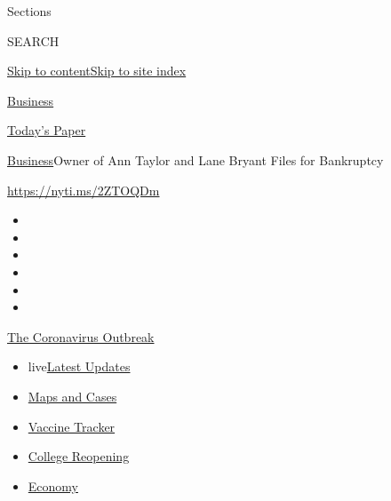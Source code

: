 Sections

SEARCH

\protect\hyperlink{site-content}{Skip to
content}\protect\hyperlink{site-index}{Skip to site index}

\href{https://www.nytimes3xbfgragh.onion/section/business}{Business}

\href{https://myaccount.nytimes3xbfgragh.onion/auth/login?response_type=cookie\&client_id=vi}{}

\href{https://www.nytimes3xbfgragh.onion/section/todayspaper}{Today's
Paper}

\href{/section/business}{Business}\textbar{}Owner of Ann Taylor and Lane
Bryant Files for Bankruptcy

\url{https://nyti.ms/2ZTOQDm}

\begin{itemize}
\item
\item
\item
\item
\item
\item
\end{itemize}

\href{https://www.nytimes3xbfgragh.onion/news-event/coronavirus?action=click\&pgtype=Article\&state=default\&region=TOP_BANNER\&context=storylines_menu}{The
Coronavirus Outbreak}

\begin{itemize}
\tightlist
\item
  live\href{https://www.nytimes3xbfgragh.onion/2020/08/03/world/coronavirus-covid-19.html?action=click\&pgtype=Article\&state=default\&region=TOP_BANNER\&context=storylines_menu}{Latest
  Updates}
\item
  \href{https://www.nytimes3xbfgragh.onion/interactive/2020/us/coronavirus-us-cases.html?action=click\&pgtype=Article\&state=default\&region=TOP_BANNER\&context=storylines_menu}{Maps
  and Cases}
\item
  \href{https://www.nytimes3xbfgragh.onion/interactive/2020/science/coronavirus-vaccine-tracker.html?action=click\&pgtype=Article\&state=default\&region=TOP_BANNER\&context=storylines_menu}{Vaccine
  Tracker}
\item
  \href{https://www.nytimes3xbfgragh.onion/2020/08/02/us/covid-college-reopening.html?action=click\&pgtype=Article\&state=default\&region=TOP_BANNER\&context=storylines_menu}{College
  Reopening}
\item
  \href{https://www.nytimes3xbfgragh.onion/live/2020/08/03/business/stock-market-today-coronavirus?action=click\&pgtype=Article\&state=default\&region=TOP_BANNER\&context=storylines_menu}{Economy}
\end{itemize}

